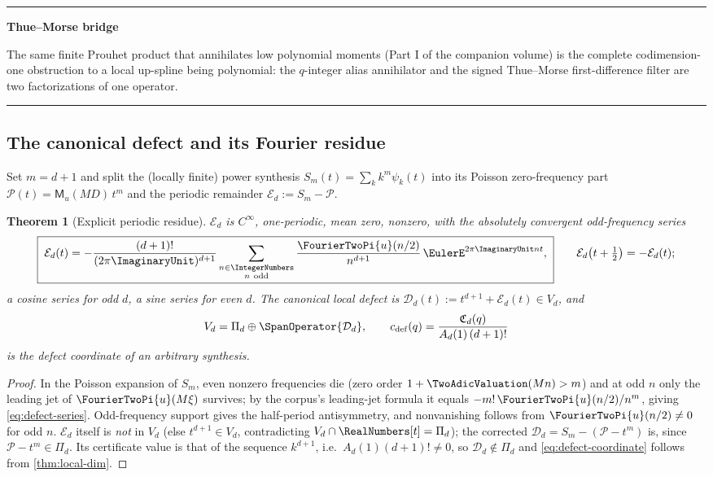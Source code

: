 \documentclass[11pt,oneside]{article}
\numberwithin{equation}{section}
\newtheorem{theorem}{Theorem}[section]
\theoremstyle{definition}
\theoremstyle{remark}
\newcommand{\MM}{\mathsf M}
\newcommand{\PiD}{\Pi_d}
\newenvironment{statusbox}[1]{%
  \par\smallskip\noindent\begin{center}\begin{minipage}{0.94\textwidth}%
  \hrule\vspace{0.5em}\noindent\textbf{#1}\par\smallskip
}{%
  \vspace{0.5em}\hrule\end{minipage}\end{center}\smallskip
}
\begin{document}
\begin{statusbox}{Thue--Morse bridge}
The same finite Prouhet product that annihilates low polynomial
moments (Part I of the companion volume) is the complete
codimension-one obstruction to a local up-spline being polynomial:
the $q$-integer alias annihilator and the signed Thue--Morse
first-difference filter are two factorizations of one operator.
\end{statusbox}

\subsection{The canonical defect and its Fourier residue}

Set $m=d+1$ and split the (locally finite) power synthesis
$S_m(t)=\sum_kk^{m}\psi_k(t)$ into its Poisson zero-frequency part
$\mathcal P(t)=\MM_u(MD)\,t^{m}$ and the periodic remainder
$\mathcal E_d:=S_m-\mathcal P$.

\begin{theorem}[Explicit periodic residue]
\label{thm:defect-Fourier}
$\mathcal E_d$ is $C^\infty$, one-periodic, mean zero, nonzero, with
the absolutely convergent odd-frequency series
\begin{equation}
 \boxed{\;
 \mathcal E_d(t)=
 -\frac{(d+1)!}{(2\pi\ImaginaryUnit)^{d+1}}
 \sum_{\substack{n\in\IntegerNumbers\\ n\ \mathrm{odd}}}
 \frac{\FourierTwoPi{u}(n/2)}{n^{d+1}}\,\EulerE^{2\pi\ImaginaryUnit nt},
 \;}
 \qquad
 \mathcal E_d\bigl(t+\tfrac12\bigr)=-\mathcal E_d(t);
 \label{eq:defect-series}
\end{equation}
a cosine series for odd $d$, a sine series for even $d$.  The
canonical local defect is
$\mathcal D_d(t):=t^{d+1}+\mathcal E_d(t)\in V_d$, and
\begin{equation}
 V_d=\PiD\oplus\SpanOperator\{\mathcal D_d\},
 \qquad
 c_{\mathrm{def}}(q)
 =\frac{\mathfrak C_d(q)}{A_d(1)\,(d+1)!}
 \label{eq:defect-coordinate}
\end{equation}
is the defect coordinate of an arbitrary synthesis.
\end{theorem}

\begin{proof}
In the Poisson expansion of $S_m$, even nonzero frequencies die
(zero order $1+\TwoAdicValuation(Mn)>m$) and at odd $n$ only the leading jet of
$\FourierTwoPi{u}(M\xi)$ survives; by the corpus's leading-jet formula it
equals $-m!\,\FourierTwoPi{u}(n/2)/n^{m}$, giving
\eqref{eq:defect-series}.  Odd-frequency support gives the
half-period antisymmetry, and nonvanishing follows from
$\FourierTwoPi{u}(n/2)\ne0$ for odd $n$.  $\mathcal E_d$ itself is
\emph{not} in $V_d$ (else $t^{d+1}\in V_d$, contradicting
$V_d\cap\RealNumbers[t]=\PiD$); the corrected $\mathcal D_d=S_m-(\mathcal
P-t^{m})$ is, since $\mathcal P-t^{m}\in\PiD$.  Its certificate value
is that of the sequence $k^{d+1}$, i.e.\ $A_d(1)(d+1)!\ne0$, so
$\mathcal D_d\notin\PiD$ and \eqref{eq:defect-coordinate} follows
from \cref{thm:local-dim}.
\end{proof}
\end{document}

